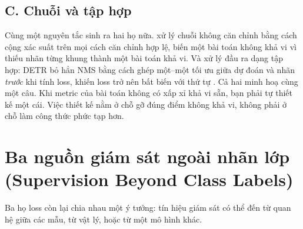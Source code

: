 \documentclass[../../deep_learning.tex]{subfiles}
\begin{document}
\subsection{C. Chuỗi và tập hợp}

Cùng một nguyên tắc sinh ra hai họ nữa.  xử lý chuỗi không căn chỉnh bằng cách cộng xác suất trên mọi cách căn chỉnh hợp lệ, biến một bài toán không khả vi vì thiếu nhãn từng khung thành một bài toán khả vi. Và  xử lý đầu ra dạng tập hợp: DETR bỏ hẳn NMS bằng cách ghép một--một tối ưu giữa dự đoán và nhãn \emph{trước} khi tính loss, khiến loss trở nên bất biến với thứ tự \cite{carion2020detr}. Cả hai minh hoạ cùng một câu. Khi metric của bài toán không có xấp xỉ khả vi sẵn, bạn phải tự thiết kế một cái. Việc thiết kế nằm ở chỗ gỡ đúng điểm không khả vi, không phải ở chỗ làm công thức phức tạp hơn.

\section{Ba nguồn giám sát ngoài nhãn lớp (Supervision Beyond Class Labels)}

Ba họ loss còn lại chia nhau một ý tưởng: tín hiệu giám sát có thể đến từ quan hệ giữa các mẫu, từ vật lý, hoặc từ một mô hình khác.
\end{document}
